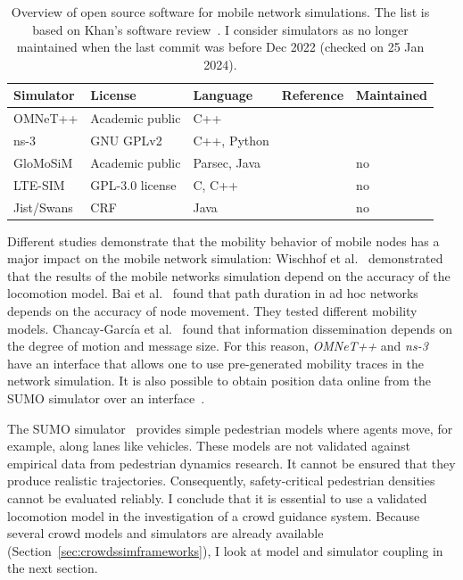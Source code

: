 \begin{table}[hbt!]
\begin{tabular}{p{2.7cm}p{3.2cm}p{2.5cm}p{1.8cm}p{1.8cm}}
\hline
{Simulator} & {License} & {Language} & Reference & Maintained \\
\hline
OMNeT++ & Academic public & C++ & \cite{varga-2019-com} \\
ns-3 & GNU GPLv2 & C++, Python & \cite{riley-2010-com} \\ 
GloMoSiM & Academic public & Parsec, Java & \cite{zeng-1998-com} & no \\
LTE-SIM & GPL-3.0 license & C, C++& \cite{piro-2011-com} & no\\
Jist/Swans & CRF & Java & \cite{barr-2004-com} & no\\ \hline
\end{tabular}
\caption[]{Overview of open source software for mobile network simulations. The list is based on Khan's software review~\cite{khan-2012-com}. I consider simulators as no longer maintained when the last commit was before Dec 2022 (checked on 25 Jan 2024). }
\label{tab:overviewcrowdsimulators}
\end{table}

Different studies demonstrate that the mobility behavior of mobile nodes has a major impact on the  mobile network simulation: Wischhof et al.~\cite{wischhof-2022b-com} demonstrated that the results of the mobile networks simulation depend on the accuracy of the locomotion model.
Bai et al.~\cite{bai-2004-com}  found  that path duration in ad hoc networks depends on the accuracy of node movement. They tested different mobility models. Chancay-Garc\'{i}a et al.~\cite{chancay-2018-com} found that information dissemination depends on the degree of motion and message size. 
For this reason, \textit{OMNeT++} and \textit{ns-3} have an interface that allows one to use pre-generated mobility traces in the network simulation. It is also possible to obtain position data online from the SUMO simulator over an interface~\cite{wegener-2008-com}. 

The SUMO simulator~\cite{wegener-2008-com} provides simple pedestrian models where agents move, for example, along lanes like vehicles. These models are not validated against empirical data from pedestrian dynamics research. It cannot be ensured that they produce realistic trajectories. Consequently, safety-critical pedestrian densities cannot be evaluated reliably. I conclude that it is essential to use a validated locomotion model in the investigation of a crowd guidance system. Because several crowd models and simulators are already available (Section~\ref{sec:crowdssimframeworks}), I look at model and simulator coupling in the next section.


